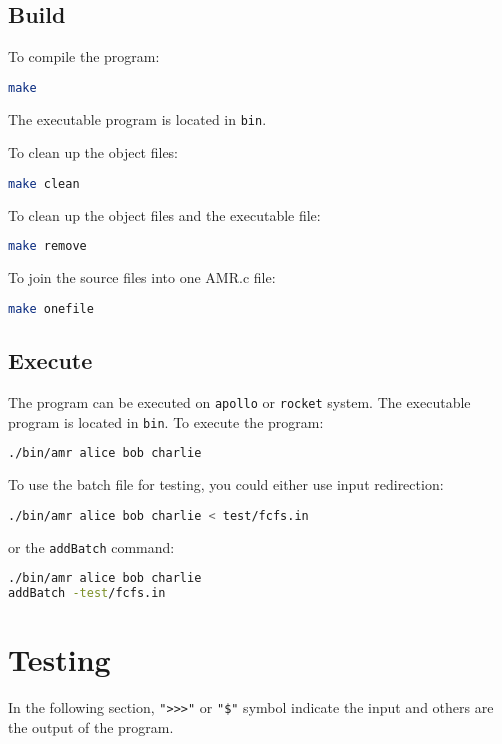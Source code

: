 \documentclass[12pt,a4paper]{report}
\begin{document}
\section{Build}
To compile the program:
\begin{lstlisting}[language=bash,basicstyle=\ttfamily,keywordstyle=\bfseries]
make
\end{lstlisting}
The executable program is located in \texttt{bin}.

To clean up the object files:
\begin{lstlisting}[language=bash,basicstyle=\ttfamily,keywordstyle=\bfseries]
make clean
\end{lstlisting}

To clean up the object files and the executable file:
\begin{lstlisting}[language=bash,basicstyle=\ttfamily,keywordstyle=\bfseries]
make remove
\end{lstlisting}

To join the source files into one AMR.c file:
\begin{lstlisting}[language=bash,basicstyle=\ttfamily,keywordstyle=\bfseries]
make onefile
\end{lstlisting}
\section{Execute}
The program can be executed on \texttt{apollo} or \texttt{rocket} system.
The executable program is located in \texttt{bin}.
To execute the program:
\begin{lstlisting}[language=bash,basicstyle=\ttfamily,keywordstyle=\bfseries]
./bin/amr alice bob charlie
\end{lstlisting}

To use the batch file for testing, you could either use input redirection:
\begin{lstlisting}[language=bash,basicstyle=\ttfamily,keywordstyle=\bfseries]
./bin/amr alice bob charlie < test/fcfs.in
\end{lstlisting}
or the \texttt{addBatch} command:
\begin{lstlisting}[language=bash,basicstyle=\ttfamily,keywordstyle=\bfseries]
./bin/amr alice bob charlie
addBatch -test/fcfs.in
\end{lstlisting}
\appendix
\chapter{Testing}
\label{Appendix:Testing}
In the following section, \texttt{">>>"} or \texttt{"\$"} symbol indicate the input and others are the output of the program.
\end{document}
